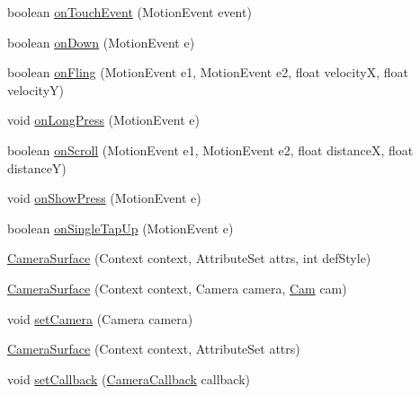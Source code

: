 \begin{DoxyCompactItemize}
boolean \hyperlink{classswp_1_1tuilmenau_1_1carduinodroid_1_1controller_1_1_camera_surface_afd3cacc6c400724abf5c5ded882363b8}{on\+Touch\+Event} (Motion\+Event event)
\item 
boolean \hyperlink{classswp_1_1tuilmenau_1_1carduinodroid_1_1controller_1_1_camera_surface_af54a5e01c5f20ac8212954280c48785a}{on\+Down} (Motion\+Event e)
\item 
boolean \hyperlink{classswp_1_1tuilmenau_1_1carduinodroid_1_1controller_1_1_camera_surface_a2c2c30bc28a1b183bfc3e0492ea1be44}{on\+Fling} (Motion\+Event e1, Motion\+Event e2, float velocity\+X, float velocity\+Y)
\item 
void \hyperlink{classswp_1_1tuilmenau_1_1carduinodroid_1_1controller_1_1_camera_surface_a99ee0d96896cfae8a3be19ce48d61926}{on\+Long\+Press} (Motion\+Event e)
\item 
boolean \hyperlink{classswp_1_1tuilmenau_1_1carduinodroid_1_1controller_1_1_camera_surface_a1cc9dc5983675f90c16b0f64cb322e29}{on\+Scroll} (Motion\+Event e1, Motion\+Event e2, float distance\+X, float distance\+Y)
\item 
void \hyperlink{classswp_1_1tuilmenau_1_1carduinodroid_1_1controller_1_1_camera_surface_ab738bf7ace1ef2c497c39984bb585369}{on\+Show\+Press} (Motion\+Event e)
\item 
boolean \hyperlink{classswp_1_1tuilmenau_1_1carduinodroid_1_1controller_1_1_camera_surface_acc22d3ff51d7099601473ce0a26f7ab5}{on\+Single\+Tap\+Up} (Motion\+Event e)
\item 
\hyperlink{classswp_1_1tuilmenau_1_1carduinodroid_1_1controller_1_1_camera_surface_a1c578c6418952fd170916dad67e26152}{Camera\+Surface} (Context context, Attribute\+Set attrs, int def\+Style)
\item 
\hyperlink{classswp_1_1tuilmenau_1_1carduinodroid_1_1controller_1_1_camera_surface_a51856c105777cea804768ed2be7f7aa4}{Camera\+Surface} (Context context, Camera camera, \hyperlink{classswp_1_1tuilmenau_1_1carduinodroid_1_1controller_1_1_cam}{Cam} cam)
\item 
void \hyperlink{classswp_1_1tuilmenau_1_1carduinodroid_1_1controller_1_1_camera_surface_ac0aa798901364be1828f205d940caf4d}{set\+Camera} (Camera camera)
\item 
\hyperlink{classswp_1_1tuilmenau_1_1carduinodroid_1_1controller_1_1_camera_surface_a194d84cc79b5b31f67e620d781438ed3}{Camera\+Surface} (Context context, Attribute\+Set attrs)
\item 
void \hyperlink{classswp_1_1tuilmenau_1_1carduinodroid_1_1controller_1_1_camera_surface_ae9a5ce16713f1cfdb31de1fd212b25e5}{set\+Callback} (\hyperlink{interfaceswp_1_1tuilmenau_1_1carduinodroid_1_1controller_1_1_camera_callback}{Camera\+Callback} callback)

\end{DoxyCompactItemize}
